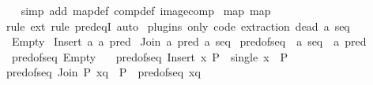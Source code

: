 \begin{isabellebody}
%
\isadelimproof
\ \ %
\endisadelimproof
%
\isatagproof
{}\isamarkupfalse%
\ {\isacharparenleft}{\kern0pt}simp\ add{\isacharcolon}{\kern0pt}\ map{\isacharunderscore}{\kern0pt}def\ comp{\isacharunderscore}{\kern0pt}def\ image{\isacharunderscore}{\kern0pt}comp{\isacharparenright}{\kern0pt}%
\endisatagproof
{\isafoldproof}%
%
\isadelimproof
\isanewline
%
\endisadelimproof
\isanewline
{}\isamarkupfalse%
\ map{\isacharcolon}{\kern0pt}\ map\isanewline
%
\isadelimproof
\ \ %
\endisadelimproof
%
\isatagproof
{}\isamarkupfalse%
\ {\isacharparenleft}{\kern0pt}rule\ ext{\isacharcomma}{\kern0pt}\ rule\ pred{\isacharunderscore}{\kern0pt}eqI{\isacharcomma}{\kern0pt}\ auto{\isacharparenright}{\kern0pt}{\isacharplus}{\kern0pt}%
\endisatagproof
{\isafoldproof}%
%
\isadelimproof
%
\endisadelimproof
%
\isadelimdocument
%
\endisadelimdocument
%
\isatagdocument
%
\isamarkuptrue%
%
\endisatagdocument
{\isafolddocument}%
%
\isadelimdocument
%
\endisadelimdocument
{}\isamarkupfalse%
\ {\isacharparenleft}{\kern0pt}plugins\ only{\isacharcolon}{\kern0pt}\ code\ extraction{\isacharparenright}{\kern0pt}\ {\isacharparenleft}{\kern0pt}dead\ {\isacharprime}{\kern0pt}a{\isacharparenright}{\kern0pt}\ seq\ {\isacharequal}{\kern0pt}\isanewline
\ \ Empty\isanewline
{\isacharbar}{\kern0pt}\ Insert\ {\isachardoublequoteopen}{\isacharprime}{\kern0pt}a{\isachardoublequoteclose}\ {\isachardoublequoteopen}{\isacharprime}{\kern0pt}a\ pred{\isachardoublequoteclose}\isanewline
{\isacharbar}{\kern0pt}\ Join\ {\isachardoublequoteopen}{\isacharprime}{\kern0pt}a\ pred{\isachardoublequoteclose}\ {\isachardoublequoteopen}{\isacharprime}{\kern0pt}a\ seq{\isachardoublequoteclose}\isanewline
\isanewline
{}\isamarkupfalse%
\ pred{\isacharunderscore}{\kern0pt}of{\isacharunderscore}{\kern0pt}seq\ {\isacharcolon}{\kern0pt}{\isacharcolon}{\kern0pt}\ {\isachardoublequoteopen}{\isacharprime}{\kern0pt}a\ seq\ {\isasymRightarrow}\ {\isacharprime}{\kern0pt}a\ pred{\isachardoublequoteclose}\ \isanewline
\ \ {\isachardoublequoteopen}pred{\isacharunderscore}{\kern0pt}of{\isacharunderscore}{\kern0pt}seq\ Empty\ {\isacharequal}{\kern0pt}\ {\isasymbottom}{\isachardoublequoteclose}\isanewline
{\isacharbar}{\kern0pt}\ {\isachardoublequoteopen}pred{\isacharunderscore}{\kern0pt}of{\isacharunderscore}{\kern0pt}seq\ {\isacharparenleft}{\kern0pt}Insert\ x\ P{\isacharparenright}{\kern0pt}\ {\isacharequal}{\kern0pt}\ single\ x\ {\isasymsqunion}\ P{\isachardoublequoteclose}\isanewline
{\isacharbar}{\kern0pt}\ {\isachardoublequoteopen}pred{\isacharunderscore}{\kern0pt}of{\isacharunderscore}{\kern0pt}seq\ {\isacharparenleft}{\kern0pt}Join\ P\ xq{\isacharparenright}{\kern0pt}\ {\isacharequal}{\kern0pt}\ P\ {\isasymsqunion}\ pred{\isacharunderscore}{\kern0pt}of{\isacharunderscore}{\kern0pt}seq\ xq{\isachardoublequoteclose}\isanewline

\end{isabellebody}
